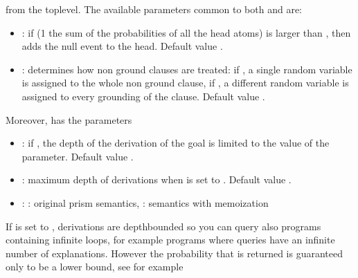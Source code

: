 \documentclass[letterpaper,10pt,english]{sphinxmanual}
\begin{document}
\sphinxAtStartPar
from the top\sphinxhyphen{}level.
The available parameters common to both  and  are:
\begin{itemize}
\item {} 
\sphinxAtStartPar
{}: if (1 \sphinxhyphen{} the sum of the probabilities of all the head atoms) is larger than , then  adds the null event to the head. Default value .

\item {} 
\sphinxAtStartPar
{}: determines how non ground clauses are treated: if , a single random variable is assigned to the whole non ground clause, if , a different random variable is assigned to every grounding of the clause. Default value .

\end{itemize}

\sphinxAtStartPar
Moreover,  has the parameters
\begin{itemize}
\item {} 
\sphinxAtStartPar
{}: if , the depth of the derivation of the goal is limited to the value of the  parameter. Default value .

\item {} 
\sphinxAtStartPar
{}: maximum depth of derivations when  is set to . Default value .

\item {} 
\sphinxAtStartPar
{}: : original prism semantics, : semantics with memoization

\end{itemize}

\sphinxAtStartPar
If  is set to , derivations are depth\sphinxhyphen{}bounded so you can query also programs containing infinite loops, for example programs where queries have an infinite number of explanations.
However the probability that is returned is guaranteed only to be a lower bound, see for example 
\end{document}

